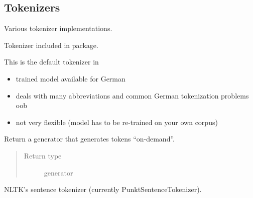 \documentclass[letterpaper,10pt,english]{sphinxmanual}
\begin{document}
\subsection{Tokenizers}
\label{api_reference:tokenizers}\label{api_reference:module-textblob_de.tokenizers}
Various tokenizer implementations.

\begin{fulllineitems}
\label{api_reference:textblob_de.tokenizers.NLTKPunktTokenizer}
Tokenizer included in  package.

This is the default tokenizer in 
\begin{itemize}
\item {} 
trained model available for German

\item {} 
deals with many abbreviations and common German tokenization problems oob

\end{itemize}
\begin{itemize}
\item {} 
not very flexible (model has to be re-trained on your own corpus)

\end{itemize}

\begin{fulllineitems}
\label{api_reference:textblob_de.tokenizers.NLTKPunktTokenizer.itokenize}
Return a generator that generates tokens ``on-demand''.

\begin{quote}\begin{description}
\item[{Return type}] \leavevmode
generator

\end{description}\end{quote}

\end{fulllineitems}


\begin{fulllineitems}
\label{api_reference:textblob_de.tokenizers.NLTKPunktTokenizer.sent_tokenize}
NLTK's sentence tokenizer (currently PunktSentenceTokenizer).


\end{fulllineitems}
\end{fulllineitems}
\end{document}

